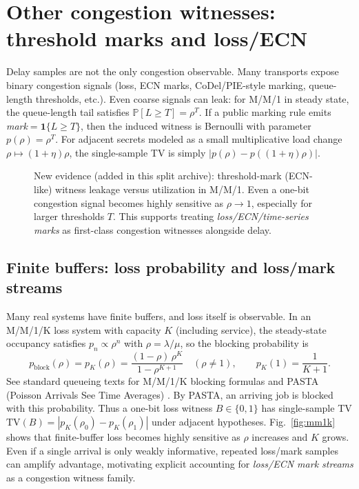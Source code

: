 \documentclass[11pt]{article}
\theoremstyle{definition}
\theoremstyle{remark}
\newcommand{\TV}{\mathrm{TV}}
\newcommand{\Prb}{\mathbb{P}}
\begin{document}
\section{Other congestion witnesses: threshold marks and loss/ECN}
Delay samples are not the only congestion observable.
Many transports expose binary congestion signals (loss, ECN marks, CoDel/PIE-style marking, queue-length thresholds, etc.).
Even coarse signals can leak: for M/M/1 in steady state, the queue-length tail satisfies $\Prb[L\ge T]=\rho^T$.
If a public marking rule emits \emph{mark}$=\mathbf{1}\{L\ge T\}$, then the induced witness is Bernoulli with parameter $p(\rho)=\rho^T$.
For adjacent secrets modeled as a small multiplicative load change $\rho\mapsto (1+\eta)\rho$, the single-sample TV is simply $|p(\rho)-p((1+\eta)\rho)|$.

\begin{figure}[t]
\centering
{}
\caption{New evidence (added in this split archive): threshold-mark (ECN-like) witness leakage versus utilization in M/M/1.
Even a one-bit congestion signal becomes highly sensitive as $\rho\to 1$, especially for larger thresholds $T$.
This supports treating \emph{loss/ECN/time-series marks} as first-class congestion witnesses alongside delay.}
\label{fig:ecn}
\end{figure}

\subsection{Finite buffers: loss probability and loss/mark streams}
Many real systems have finite buffers, and loss itself is observable.
In an M/M/1/K loss system with capacity $K$ (including service), the steady-state occupancy satisfies
$p_n \propto \rho^n$ with $\rho=\lambda/\mu$, so the blocking probability is
\[p_{\mathrm{block}}(\rho)=p_K(\rho)=\frac{(1-\rho)\,\rho^K}{1-\rho^{K+1}}\quad (\rho\neq 1),\qquad p_K(1)=\frac{1}{K+1}.\]
See standard queueing texts for M/M/1/K blocking formulas and PASTA (Poisson Arrivals See Time Averages) \cite{gross_harris,asmussen2003,wolff_pasta1982}.
By PASTA, an arriving job is blocked with this probability.
Thus a one-bit loss witness $B\in\{0,1\}$ has single-sample TV
$\TV(B)=|p_K(\rho_0)-p_K(\rho_1)|$ under adjacent hypotheses.
Fig.~\ref{fig:mm1k} shows that finite-buffer loss becomes highly sensitive as $\rho$ increases and $K$ grows.
Even if a single arrival is only weakly informative, repeated loss/mark samples can amplify advantage, motivating explicit accounting for 
\emph{loss/ECN mark streams} as a congestion witness family.
\end{document}
